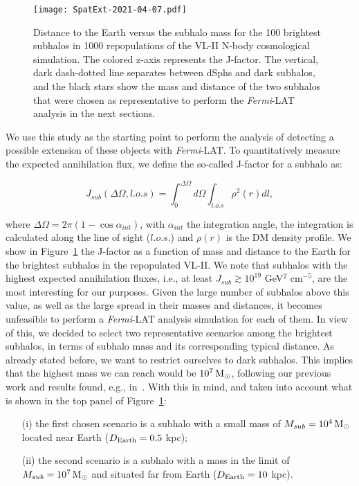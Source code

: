 \documentclass[%
 reprint,
nofootinbib,
 amsmath,amssymb,
 aps,
]{revtex4-2}
\begin{document}
\begin{figure}[!ht]
\centering
\texttt{[image: SpatExt-2021-04-07.pdf]}
\caption{Distance to the Earth versus the subhalo mass for the 100 brightest subhalos in 1000 repopulations of the VL-II N-body cosmological simulation. The colored z-axis represents the J-factor. The vertical, dark dash-dotted line separates between dSphs and dark subhalos, and the black stars show the mass and distance of the two subhalos that were chosen as representative to perform the \textit{Fermi}-LAT analysis in the next sections.}
\label{fig:vliirep}
\end{figure}

We use this study as the starting point to perform the analysis of detecting a possible extension of these objects with \textit{Fermi}-LAT. To quantitatively measure the expected annihilation flux, we define the so-called J-factor for a subhalo as:

\begin{equation}\label{eq:j-factor}
J_{sub}(\Delta\Omega, l.o.s) = \int_0^{\Delta\Omega}d\Omega\int_{l.o.s}\rho^2(r)dl,
\end{equation}

\noindent where $\Delta\Omega=2\pi(1-\cos\alpha_{int})$, with $\alpha_{int}$ the integration angle, the integration is calculated along the line of sight ($l.o.s.$) and $\rho(r)$ is the DM density profile. We show in Figure~\ref{fig:vliirep} the J-factor as a function of mass and distance to the Earth for the brightest subhalos in the repopulated VL-II. We note that subhalos with the highest expected annihilation fluxes, i.e., at least $J_{sub}\gtrsim 10^{19}$ GeV$^2$ cm$^{-5}$, are the most interesting for our purposes. Given the large number of subhalos above this value, as well as the large spread in their masses and distances, it becomes unfeasible to perform a \textit{Fermi}-LAT analysis simulation for each of them. In view of this, {  we decided to select two representative scenarios among the brightest subhalos, in terms of subhalo mass and its corresponding typical distance.} As already stated before, we want to restrict ourselves to dark subhalos. This implies that the highest mass we can reach would be $10^7\, \rm M_{\odot}$, following our previous work and results found, e.g., in~\cite{Sawala_2015}.  With this in mind, and taken into account what is shown in the top panel of Figure~\ref{fig:vliirep}:

\begin{itemize}
    \item[(i)] the first chosen scenario is a subhalo with a small mass of $M_{sub} = 10^4\, \rm M_{\odot}$ located near Earth ($D_{\rm Earth} = 0.5$ kpc);
    \item[(ii)] the second scenario is a subhalo with a mass in the limit of $M_{sub} = 10^7\, \rm M_{\odot}$ and situated far from Earth ($D_{\rm Earth} = 10$ kpc).
\end{itemize}
\end{document}
